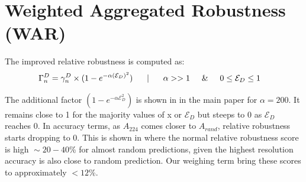 \section{Weighted Aggregated Robustness (WAR)}

The improved relative robustness is computed as:
\begin{align}
    \Gamma^{D}_{n} &= \gamma^{D}_{n} \times (1 -  e^{- \alpha (\mathcal{E}_D)^2}) \hspace{0.5cm} \mid \hspace{0.5cm} \alpha >> 1 \hspace{0.5cm} \& \hspace{0.5cm} 0 \le \mathcal{E}_D \le 1 \label{eq:improved_robsutness_again}
\end{align}

The additional factor $(1 -  e^{- \alpha \mathcal{E}_D^2})$ is shown in  in the main paper for $\alpha=200$. It remains close to 1 for the majority values of x or  $\mathcal{E}_D$ but steeps to 0 as $\mathcal{E}_D$ reaches 0. In accuracy terms, as $A_{224}$ comes closer to $A_{rand}$, relative robustness starts dropping to 0. This is shown in  where the normal relative robustness score is high $\!\sim\!20-40$\% for almost random predictions, given the highest resolution accuracy is also close to random prediction. Our weighing term bring these scores to approximately $<12$\%. 




